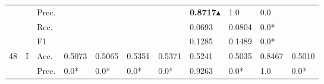 \begin{tabular}{cclllllllll}
                                                                                           &                                   & Prec.                                                &                         &                         &                              &                         & \textbf{0.8717}$\blacktriangle$                                                             & 1.0                                                                         & 0.0                                       &                                           \\
                                                                                           &                                   & Rec.                                                 &                         &                         &                              &                         & 0.0693                                                                       & 0.0804                                                                      & 0.0*                                      &                                           \\
                                                                                           &                                   & F1                                                   &                         &                         &                              &                         & 0.1285                                                                       & 0.1489                                                                      & 0.0*                                      &                                           \\ 
    \midrule
    \multirow{12}{*}{48}                                                                   & \multirow{4}{*}{I}                & Acc.                                                 & 0.5073                  & 0.5065                  & 0.5351                       & 0.5371                  & 0.5241                                                                       & 0.5035                                                                      & 0.8467                                    & 0.5010                                    \\
                                                                                           &                                   & Prec.                                                & 0.0*                    & 0.0*                    & 0.0*                         & 0.0*                    & 0.9263                                                                       & 0.0*                                                                        & 1.0                                       & 0.0*                                      \\

\end{tabular}
